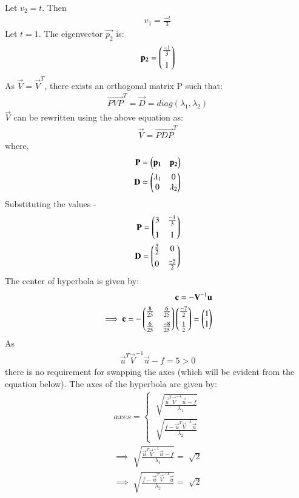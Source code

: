 Let $v_2 = t$. Then
\begin{align}
  v_1 = \frac{-t}{3}
\end{align}
Let $t = 1$. The eigenvector $\vec{p_2}$ is:
\begin{align}
  \mathbf{p_2} = \begin{pmatrix}\frac{-1}{3} \\[0.2cm] 1\end{pmatrix}
\end{align}
As $\vec{V} = \vec{V}^T$, there exists an orthogonal matrix P such that:
\begin{align}
  \vec{PVP}^T = \vec{D} = diag(\lambda_1, \lambda_2)
\end{align}
$\vec{V}$ can be rewritten using the above equation as:
\begin{align}
  \vec{V} = \vec{PDP}^T
\end{align}
where,
\begin{align}
  \mathbf{P} = \begin{pmatrix}\mathbf{p_1} & \mathbf{p_2}\end{pmatrix} \\
  \mathbf{D} = \begin{pmatrix}\lambda_1 & 0 \\ 0 & \lambda_2\end{pmatrix}
\end{align}
Substituting the values -
\begin{align}
  \mathbf{P} = \begin{pmatrix}3 & \frac{-1}{3}\\[0.2cm] 1 & 1\end{pmatrix} \\
  \mathbf{D} = \begin{pmatrix}\frac{5}{2} & 0 \\[0.2cm] 0 & \frac{-5}{2}\end{pmatrix}
\end{align}
The center of hyperbola is given by:
\begin{align}
  \mathbf{c} = -\mathbf{V}^{-1}\mathbf{u} \\
  \implies \mathbf{c} = -\begin{pmatrix}\frac{8}{25} & \frac{6}{25} \\[0.2cm] \frac{6}{25} & \frac{-8}{25}\end{pmatrix} \begin{pmatrix}\frac{-7}{2} \\[0.2cm]\frac{1}{2}\end{pmatrix} = \begin{pmatrix}1 \\ 1\end{pmatrix}
\end{align}
As
\begin{align}
  \vec{u}^T\vec{V}^{-1}\vec{u} - f = 5 > 0
\end{align}
there is no requirement for swapping the axes (which will be evident from the equation below). The axes of the hyperbola are given by:
\begin{align}
  axes = \begin{cases}
    \sqrt[]{\frac{\vec{u}^T\vec{V}^{-1}\vec{u} - f}{\lambda_1}} \\
    \sqrt[]{\frac{f - \vec{u}^T\vec{V}^{-1}\vec{u}}{\lambda_2}}
  \end{cases} \\
  \implies \sqrt[]{\frac{\vec{u}^T\vec{V}^{-1}\vec{u} - f}{\lambda_1}} = \sqrt[]{2} \\
  \implies \sqrt[]{\frac{f - \vec{u}^T\vec{V}^{-1}\vec{u}}{\lambda_2}} = \sqrt[]{2}
\end{align}
